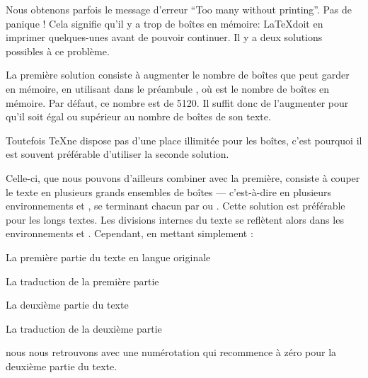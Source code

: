 Nous obtenons parfois le message d'erreur \enquote{Too many  without printing}. Pas de panique ! Cela signifie qu'il y a trop de boîtes en mémoire: \LaTeX  doit en imprimer quelques-unes avant de pouvoir continuer.  Il y a deux solutions possibles à ce problème.

La première solution consiste à  augmenter le nombre de boîtes que  peut garder en mémoire, en utilisant dans le préambule , où  est le nombre de boîtes en mémoire. Par défaut, ce nombre est de 5120. Il suffit donc de l'augmenter  pour qu'il soit égal ou supérieur au nombre de boîtes de son  texte. 

Toutefois \TeX ne dispose pas d'une place illimitée pour les boîtes, c'est pourquoi il est souvent préférable d'utiliser la seconde solution.


Celle-ci, que nous pouvons d'ailleurs combiner avec la première, consiste à  couper le texte en plusieurs grands ensembles de boîtes --- c'est-à-dire en plusieurs environnements  et , se terminant chacun par  ou .  Cette solution est préférable pour les longs textes. Les divisions internes du texte se reflètent alors dans les environnements  et . Cependant,  en mettant simplement :

\begin{latexcode}
\begin{pages}  
\begin{Leftside}  \beginnumbering 
La première partie du texte en langue originale
\endnumbering  \end{Leftside} 
 
\begin{Rightside} \beginnumbering
La traduction de la première partie
\endnumbering \end{Rightside} 
 \Pages
 
\begin{Leftside} \beginnumbering  
La deuxième partie du texte 
\endnumbering  \end{Leftside} 
 
\begin{Rightside}  \beginnumbering
La traduction de la deuxième partie
\endnumbering \end{Rightside} 
 \Pages

  \end{pages}
\end{latexcode}

nous nous retrouvons avec une numérotation qui recommence à zéro pour la deuxième partie du texte. 

